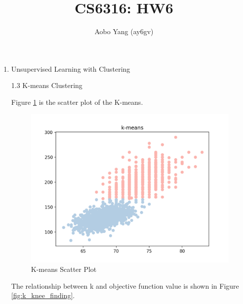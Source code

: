 \documentclass[11pt]{article}
\begin{document}
\author{Aobo Yang (ay6gv)}
\title{CS6316: HW6}
\maketitle

\medskip

\begin{enumerate}

\item
Unsupervised Learning with Clustering

1.3 K-means Clustering

\medskip

Figure \ref{fig:k_means} is the scatter plot of the K-means.

\begin{figure}[!h]
  \centering
  \includegraphics[width=\linewidth]{figures/k_means.png}
  \caption{K-means Scatter Plot}
  \label{fig:k_means}
\end{figure}

The relationship between k and objective function value is shown in Figure \ref{fig:k_knee_finding}.


\end{enumerate}
\end{document}
